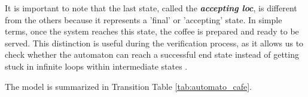 It is important to note that the last state, called the \textbf{\textit{accepting loc}}, is different from the others because it represents a 'final' or 'accepting' state. In simple terms, once the system reaches this state, the coffee is prepared and ready to be served. This distinction is useful during the verification process, as it allows us to check whether the automaton can reach a successful end state instead of getting stuck in infinite loops within intermediate states \cite{IMITATOR}.

The model is summarized in Transition Table \ref{tab:automato_cafe}.

\paragraph{}



\begin{table}[h!]
\centering
{}
\caption{Transition table of the coffee machine automaton.}
\label{tab:automato_cafe}
\end{table}



